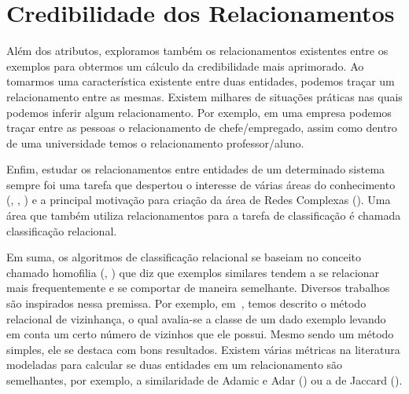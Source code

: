 
\section{Credibilidade dos Relacionamentos}
\label{sec::classificacaografos}

Além dos atributos, exploramos também os relacionamentos existentes entre os exemplos para obtermos um cálculo da credibilidade mais aprimorado.
Ao tomarmos uma característica existente entre duas entidades, podemos traçar um relacionamento entre as mesmas.
Existem milhares de situações práticas nas quais podemos inferir algum relacionamento. Por exemplo, em uma empresa podemos traçar entre as pessoas o relacionamento de chefe/empregado, assim como dentro de uma universidade temos o relacionamento professor/aluno. 

Enfim, estudar os relacionamentos entre entidades de um determinado sistema sempre foi uma tarefa que despertou o interesse de várias áreas do conhecimento (\cite{Onody04}, \cite{Shen05}, \cite{Rubinov10}) e a principal motivação para criação da área de Redes Complexas (\cite{Newman03}).
Uma área que também utiliza relacionamentos para a tarefa de classificação é chamada classificação relacional. %

Em suma, os algoritmos de classificação relacional se baseiam no conceito chamado homofilia (\cite{Blau77}, \cite{Mcpherson01})
que diz que 
exemplos similares tendem a se relacionar mais frequentemente e se comportar de maneira semelhante.
Diversos trabalhos são inspirados nessa premissa. Por exemplo, em~\cite{Macskassy04}, temos descrito o método relacional de vizinhança, o qual avalia-se 
a classe de um dado exemplo levando em conta um certo número de vizinhos que ele possui. Mesmo sendo um método simples, ele se destaca com bons resultados.
Existem várias métricas na literatura modeladas para calcular se duas entidades em um relacionamento são semelhantes, por exemplo, a similaridade de Adamic e Adar (\cite{Adamic03}) ou a de Jaccard (\cite{Jaccard01}).

